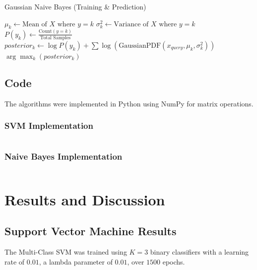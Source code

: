 \documentclass[11pt]{article}
\begin{document}
\begin{algorithm}[H]
    \caption{Gaussian Naive Bayes (Training \& Prediction)}
    \begin{algorithmic}[1]
        \State $\mu_k \gets \text{Mean of } X \text{ where } y = k$
        \State $\sigma^2_k \gets \text{Variance of } X \text{ where } y = k$
        \State $P(y_k) \gets \frac{\text{Count}(y=k)}{\text{Total Samples}}$
        \EndFor
        \EndFunction
        \State $posterior_k \gets \log P(y_k) + \sum \log \left( \text{GaussianPDF}(x_{query}, \mu_k, \sigma^2_k) \right)$
        \EndFor
        \State \Return $\arg\max_k (posterior_k)$
        \EndFunction
    \end{algorithmic}
\end{algorithm}

\subsection{Code}
The algorithms were implemented in Python using NumPy for matrix operations.
\subsubsection*{SVM Implementation}
\begin{multicols}{2}
    \inputminted{python}{./assets/svm_3class.py}
\end{multicols}

\subsubsection*{Naive Bayes Implementation}
\begin{multicols}{2}
    \inputminted{python}{./assets/naive_bayes.py}
\end{multicols}

\section{Results and Discussion}

\subsection{Support Vector Machine Results}
The Multi-Class SVM was trained using $K=3$ binary classifiers with a learning rate of $0.01$, a lambda parameter of $0.01$, over $1500$ epochs.
\end{document}
